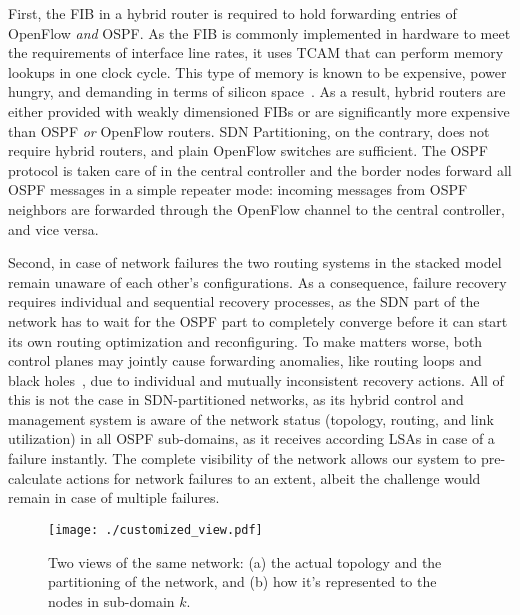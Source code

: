 \documentclass[journal]{IEEEtran}
\begin{document}
\par First, the FIB in a hybrid router is required to hold forwarding entries of OpenFlow \emph{and} OSPF. As the FIB is commonly implemented in hardware to meet the requirements of interface line rates, it uses TCAM that can perform memory lookups in one clock cycle. This type of memory is known to be expensive, power hungry, and demanding in terms of silicon space~\cite{tcam}. As a result, hybrid routers are either provided with weakly dimensioned FIBs or are significantly more expensive than OSPF \emph{or} OpenFlow routers. SDN Partitioning, on the contrary, does not require hybrid routers, and plain OpenFlow switches are sufficient. The OSPF protocol is taken care of in the central controller and the border nodes forward all OSPF messages in a simple repeater mode: incoming messages from OSPF neighbors are forwarded through the OpenFlow channel to the central controller, and vice versa.

\par Second, in case of network failures the two routing systems in the stacked model remain unaware of each other's configurations. As a consequence, failure recovery requires individual and sequential recovery processes, as the SDN part of the network has to wait for the OSPF part to completely converge before it can start its own routing optimization and reconfiguring. To make matters worse, both control planes may jointly cause forwarding anomalies, like routing loops and black holes~\cite{Vissicchio2}, due to individual and mutually inconsistent recovery actions. All of this is not the case in SDN-partitioned networks, as its hybrid control and management system is aware of the network status (topology, routing, and link utilization) in all OSPF sub-domains, as it receives according LSAs in case of a failure instantly. The complete visibility of the network allows our system to pre-calculate actions for network failures to an extent, albeit the challenge would remain in case of multiple failures. 

\begin{figure}[t] \center
\texttt{[image: ./customized\_view.pdf]}
\caption{Two views of the same network: (a) the actual topology and the partitioning of the network, and (b) how it's represented to the nodes in sub-domain $k$.}
\label{view} \end{figure}
\end{document}
